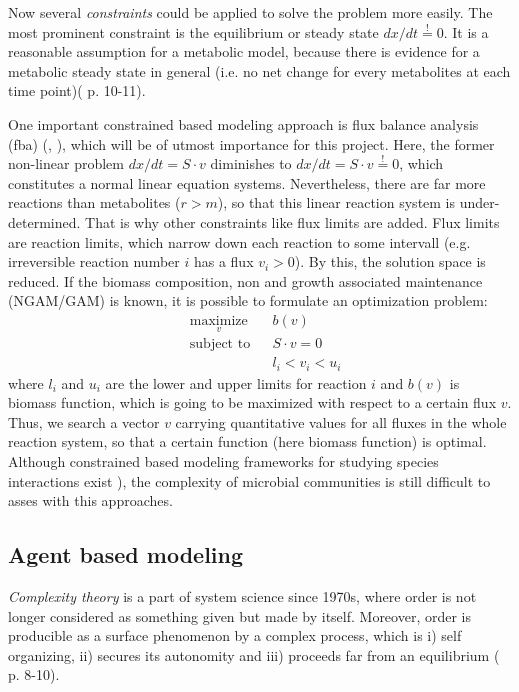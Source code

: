 Now several \textit{constraints} could be applied to solve the problem more easily. The most prominent constraint is the equilibrium or steady state $dx/dt \stackrel{!}{=}0$.
It is a reasonable assumption for a metabolic model, because there is evidence for a metabolic steady state in general (i.e. no net change for every metabolites at each time point)(\cite{Harris1995} p. 10-11).

One important constrained based modeling approach is flux balance analysis (fba) (\cite{Varma1994}, \cite{Orth2010}), which will be of utmost importance for this project.
Here, the former non-linear problem $dx/dt=S\cdot v$ diminishes to $dx/dt=S\cdot v \stackrel{!}{=}0$, which constitutes a normal linear equation systems.
Nevertheless, there are far more reactions than metabolites ($r>m$), so that this linear reaction system is under-determined.
That is why other constraints like flux limits are added.
Flux limits are reaction limits, which narrow down each reaction to some intervall (e.g. irreversible reaction number $i$ has a flux $v_i>0$).
By this, the solution space is reduced.
If the biomass composition, non and growth associated maintenance (NGAM/GAM) is known, it is possible to formulate an optimization problem:
\begin{equation*}
  \begin{aligned}
    & \underset{v}{\text{maximize}} & & b(v) \\
    & \text{subject to} & & S \cdot v = 0 \\
    & & & l_i < v_i < u_i
  \end{aligned}
\end{equation*}
where $l_i$ and $u_i$ are the lower and upper limits for reaction $i$ and $b(v)$ is biomass function, which is going to be maximized with respect to a certain flux $v$.
Thus, we search a vector $v$ carrying quantitative values for all fluxes in the whole reaction system, so that a certain function (here biomass function) is optimal. Although constrained based modeling frameworks for studying species interactions exist \cite{Klitgord10}), the complexity of microbial communities is still difficult to asses with this approaches.

\subsection{Agent based modeling}
\textit{Complexity theory} is a part of system science since 1970s, where order is not longer considered as something given but made by itself. Moreover, order is producible as a surface phenomenon by a complex process, which is i) self organizing, ii) secures its autonomity and iii) proceeds far from an equilibrium (\cite{Cilliers2007} p. 8-10).

